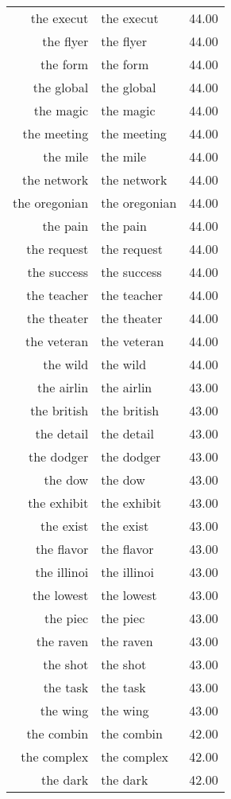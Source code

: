 \begin{table}[ht]
\begin{tabular}{rlr}
  the execut & the execut & 44.00 \\ 
  the flyer & the flyer & 44.00 \\ 
  the form & the form & 44.00 \\ 
  the global & the global & 44.00 \\ 
  the magic & the magic & 44.00 \\ 
  the meeting & the meeting & 44.00 \\ 
  the mile & the mile & 44.00 \\ 
  the network & the network & 44.00 \\ 
  the oregonian & the oregonian & 44.00 \\ 
  the pain & the pain & 44.00 \\ 
  the request & the request & 44.00 \\ 
  the success & the success & 44.00 \\ 
  the teacher & the teacher & 44.00 \\ 
  the theater & the theater & 44.00 \\ 
  the veteran & the veteran & 44.00 \\ 
  the wild & the wild & 44.00 \\ 
  the airlin & the airlin & 43.00 \\ 
  the british & the british & 43.00 \\ 
  the detail & the detail & 43.00 \\ 
  the dodger & the dodger & 43.00 \\ 
  the dow & the dow & 43.00 \\ 
  the exhibit & the exhibit & 43.00 \\ 
  the exist & the exist & 43.00 \\ 
  the flavor & the flavor & 43.00 \\ 
  the illinoi & the illinoi & 43.00 \\ 
  the lowest & the lowest & 43.00 \\ 
  the piec & the piec & 43.00 \\ 
  the raven & the raven & 43.00 \\ 
  the shot & the shot & 43.00 \\ 
  the task & the task & 43.00 \\ 
  the wing & the wing & 43.00 \\ 
  the combin & the combin & 42.00 \\ 
  the complex & the complex & 42.00 \\ 
  the dark & the dark & 42.00 \\ 

\end{tabular}
\end{table}
